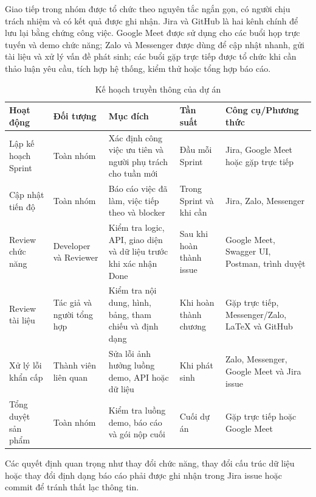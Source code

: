 Giao tiếp trong nhóm được tổ chức theo nguyên tắc ngắn gọn, có người chịu trách nhiệm và có kết quả được ghi nhận. Jira và GitHub là hai kênh chính để lưu lại bằng chứng công việc. Google Meet được sử dụng cho các buổi họp trực tuyến và demo chức năng; Zalo và Messenger được dùng để cập nhật nhanh, gửi tài liệu và xử lý vấn đề phát sinh; các buổi gặp trực tiếp được tổ chức khi cần thảo luận yêu cầu, tích hợp hệ thống, kiểm thử hoặc tổng hợp báo cáo.

\begin{table}[H]
    \centering
    \caption{Kế hoạch truyền thông của dự án}
    \label{tab:communication-plan}
    \renewcommand{\arraystretch}{1.3}
    \begin{tabularx}{\textwidth}{|p{3.0cm}|p{2.5cm}|p{4.0cm}|p{2.2cm}|Y|}
        \hline
        \textbf{Hoạt động} & \textbf{Đối tượng} & \textbf{Mục đích} & \textbf{Tần suất} & \textbf{Công cụ/Phương thức} \\
        \hline
        Lập kế hoạch Sprint & Toàn nhóm & Xác định công việc ưu tiên và người phụ trách cho tuần mới & Đầu mỗi Sprint & Jira, Google Meet hoặc gặp trực tiếp \\
        \hline
        Cập nhật tiến độ & Toàn nhóm & Báo cáo việc đã làm, việc tiếp theo và blocker & Trong Sprint và khi cần & Jira, Zalo, Messenger \\
        \hline
        Review chức năng & Developer và Reviewer & Kiểm tra logic, API, giao diện và dữ liệu trước khi xác nhận Done & Sau khi hoàn thành issue & Google Meet, Swagger UI, Postman, trình duyệt \\
        \hline
        Review tài liệu & Tác giả và người tổng hợp & Kiểm tra nội dung, hình, bảng, tham chiếu và định dạng & Khi hoàn thành chương & Gặp trực tiếp, Messenger/Zalo, LaTeX và GitHub \\
        \hline
        Xử lý lỗi khẩn cấp & Thành viên liên quan & Sửa lỗi ảnh hưởng luồng demo, API hoặc dữ liệu & Khi phát sinh & Zalo, Messenger, Google Meet và Jira issue \\
        \hline
        Tổng duyệt sản phẩm & Toàn nhóm & Kiểm tra luồng demo, báo cáo và gói nộp cuối & Cuối dự án & Gặp trực tiếp hoặc Google Meet \\
        \hline
    \end{tabularx}
\end{table}

Các quyết định quan trọng như thay đổi chức năng, thay đổi cấu trúc dữ liệu hoặc thay đổi định dạng báo cáo phải được ghi nhận trong Jira issue hoặc commit để tránh thất lạc thông tin.

